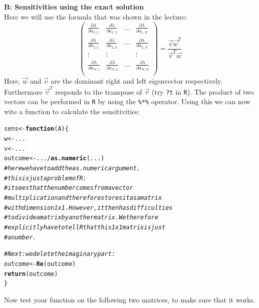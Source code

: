 \documentclass{article}\usepackage[]{graphicx}\usepackage[]{color}
\makeatletter
\newcommand{\hlcom}[1]{\textcolor[rgb]{0.678,0.584,0.686}{\textit{#1}}}%
\newcommand{\hlopt}[1]{\textcolor[rgb]{0,0,0}{#1}}%
\newcommand{\hlstd}[1]{\textcolor[rgb]{0.345,0.345,0.345}{#1}}%
\newcommand{\hlkwa}[1]{\textcolor[rgb]{0.161,0.373,0.58}{\textbf{#1}}}%
\newcommand{\hlkwb}[1]{\textcolor[rgb]{0.69,0.353,0.396}{#1}}%
\newcommand{\hlkwc}[1]{\textcolor[rgb]{0.333,0.667,0.333}{#1}}%
\newcommand{\hlkwd}[1]{\textcolor[rgb]{0.737,0.353,0.396}{\textbf{#1}}}%
\newenvironment{kframe}{%
 \def\at@end@of@kframe{}%
 \ifinner\ifhmode%
  \def\at@end@of@kframe{\end{minipage}}%
  \begin{minipage}{\columnwidth}%
 \fi\fi%
 \def\FrameCommand##1{\hskip\@totalleftmargin \hskip-\fboxsep
 \colorbox{shadecolor}{##1}\hskip-\fboxsep
     \hskip-\linewidth \hskip-\@totalleftmargin \hskip\columnwidth}%
 \MakeFramed {\advance\hsize-\width
   \@totalleftmargin\z@ \linewidth\hsize
   \@setminipage}}%
 {\par\unskip\endMakeFramed%
 \at@end@of@kframe}
\newenvironment{knitrout}{}{} %
\makeatother
\begin{document}
\begin{mdframed}
\textbf{B: Sensitivities using the exact solution}\\
Here we will use the formula that was shown in the lecture:
\begin{equation}
\begin{pmatrix} 
\frac{\partial \lambda}{\partial a_{1,1}} & \frac{\partial \lambda}{\partial a_{1,2}} & \dots & \frac{\partial \lambda}{\partial a_{1,N}} \\ 
\frac{\partial \lambda}{\partial a_{2,1}} & \frac{\partial \lambda}{\partial a_{2,2}} & \dots & \frac{\partial \lambda}{\partial a_{2,N}}\\
\vdots & \vdots & & \vdots \\
\frac{\partial \lambda}{\partial a_{N,1}} & \frac{\partial \lambda}{\partial a_{N,2}} & \dots & \frac{\partial \lambda}{\partial a_{N,N}} \\ 
\end{pmatrix}
=
 \frac{\vec{v} \vec{w}^T}{\vec{v}^T \vec{w}}
\end{equation}
Here, $\vec{w}$ and $\vec{v}$ are the dominant right and left eigenvector respectively. Furthermore $\vec{v}^T$ responds to the transpose of $\vec{v}$ (try \texttt{?t} in \texttt{R}). The product of two vectors can be performed in \texttt{R} by using the \texttt{\%*\%} operator. Using this we can now wite a function to calculate the sensitivities:
\begin{knitrout}
\color{fgcolor}\begin{kframe}
\begin{alltt}
\hlstd{sens} \hlkwb{<-} \hlkwa{function}\hlstd{(}\hlkwc{A}\hlstd{)\{}
  \hlstd{w} \hlkwb{<-} \hlstd{...}
  \hlstd{v} \hlkwb{<-} \hlstd{...}
  \hlstd{outcome} \hlkwb{<-} \hlstd{...} \hlopt{/} \hlkwd{as.numeric}\hlstd{(...)}
  \hlcom{# here we have to add the as.numeric argument.}
  \hlcom{# this is just a problem of R:}
  \hlcom{# it sees that the number comes from a vector}
  \hlcom{# multiplication and therefore stores it as a matrix}
  \hlcom{# with dimension 1x1. However, it then has difficulties}
  \hlcom{# to divide a matrix by another matrix. We therefore}
  \hlcom{# explicitly have to tell R that this 1x1 matrix is just}
  \hlcom{# a number.}

  \hlcom{# Next: we delete the imaginary part:}
  \hlstd{outcome} \hlkwb{<-} \hlkwd{Re}\hlstd{(outcome)}
  \hlkwd{return}\hlstd{(outcome)}
\hlstd{\}}
\end{alltt}
\end{kframe}
\end{knitrout}

\end{mdframed}
Now test your function on the following two matrices, to make sure that it works.
\end{document}
